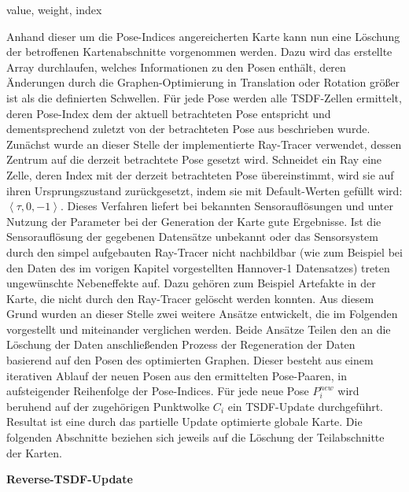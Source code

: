 \begin{myequation}
\left\langle value, weight, index \right\rangle
\end{myequation}

Anhand dieser um die Pose-Indices angereicherten Karte kann nun eine Löschung der betroffenen Kartenabschnitte vorgenommen werden. Dazu wird das erstellte Array durchlaufen, welches Informationen zu den Posen enthält, deren Änderungen durch die Graphen-Optimierung in Translation oder Rotation größer ist als die definierten Schwellen. Für jede Pose werden alle TSDF-Zellen ermittelt, deren Pose-Index dem der aktuell betrachteten Pose entspricht und dementsprechend zuletzt von der betrachteten Pose aus beschrieben wurde. Zunächst wurde an dieser Stelle der implementierte Ray-Tracer verwendet, dessen Zentrum auf die derzeit betrachtete Pose gesetzt wird. Schneidet ein Ray eine Zelle, deren Index mit der derzeit betrachteten Pose übereinstimmt, wird sie auf ihren Ursprungszustand zurückgesetzt, indem sie mit Default-Werten gefüllt wird: $\left\langle \tau, 0, -1 \right\rangle$. Dieses Verfahren liefert bei bekannten Sensorauflösungen und unter Nutzung der Parameter bei der Generation der Karte gute Ergebnisse. Ist die Sensorauflösung der gegebenen Datensätze unbekannt oder das Sensorsystem durch den simpel aufgebauten Ray-Tracer nicht nachbildbar (wie zum Beispiel bei den Daten des im vorigen Kapitel vorgestellten Hannover-1 Datensatzes) treten ungewünschte Nebeneffekte auf. Dazu gehören zum Beispiel Artefakte in der Karte, die nicht durch den Ray-Tracer gelöscht werden konnten. Aus diesem Grund wurden an dieser Stelle zwei weitere Ansätze entwickelt, die im Folgenden vorgestellt und miteinander verglichen werden. Beide Ansätze Teilen den an die Löschung der Daten anschließenden Prozess der Regeneration der Daten basierend auf den Posen des optimierten Graphen. Dieser besteht aus einem iterativen Ablauf der neuen Posen aus den ermittelten Pose-Paaren, in aufsteigender Reihenfolge der Pose-Indices. Für jede neue Pose $P_i^{new}$ wird beruhend auf der zugehörigen Punktwolke $C_i$ ein TSDF-Update durchgeführt. Resultat ist eine durch das partielle Update optimierte globale Karte. Die folgenden Abschnitte beziehen sich jeweils auf die Löschung der Teilabschnitte der Karten.

\textbf{Reverse-TSDF-Update}

